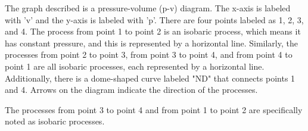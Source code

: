 The graph described is a pressure-volume (p-v) diagram. The x-axis is labeled with 'v' and the y-axis is labeled with 'p'. There are four points labeled as 1, 2, 3, and 4. The process from point 1 to point 2 is an isobaric process, which means it has constant pressure, and this is represented by a horizontal line. Similarly, the processes from point 2 to point 3, from point 3 to point 4, and from point 4 to point 1 are all isobaric processes, each represented by a horizontal line. Additionally, there is a dome-shaped curve labeled "ND" that connects points 1 and 4. Arrows on the diagram indicate the direction of the processes.

The processes from point 3 to point 4 and from point 1 to point 2 are specifically noted as isobaric processes.